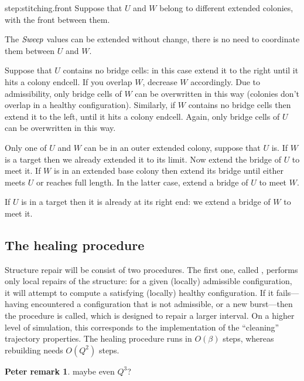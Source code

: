 \documentclass[11pt]{memoir}
\newcommand{\authnote}[3]
{\text{{ \textcolor{#3}{\( \langle\hspace{-0.2em}\langle \)\textsf{\footnotesize #1: #2}\( \rangle\hspace{-0.2em}\rangle \)}}}}
\newcommand{\authnote}[2]{}
\newcommand{\Pnote}[1]{{\authnote{P}{#1}{cyan}}}
\theoremstyle{definition} %
\newtheorem{Premark}{\color{cyan}Peter remark}
\newenvironment{premark}{\begin{Premark}\color{cyan}}{\varqed\end{Premark}}
\renewcommand{\Pnote}[1]{\begin{premark}#1\end{premark}}
\newcommand{\fld}[1]{\ensuremath{\textit{#1\/}}}
\newcommand{\Q}{Q}
\newcommand{\Sweep}{\fld{Sweep}}
\begin{document}
\begin{Proof}
\begin{step+}{step:stitching.front}
Suppose that \( U \) and \( W \) belong to different extended colonies, with the front between them.
\end{step+}
\begin{prooof}
The \( \Sweep \) values can be extended without change, there is no need to coordinate them
between \( U \) and \( W \).

Suppose that \( U \) contains no bridge cells: in this case extend it to the right until it hits
a colony endcell.
If you overlap \( W \), decrease \( W \) accordingly.
Due to admissibility, only bridge cells of \( W \) can be overwritten in this way
(colonies don't overlap in a healthy configuration).
Similarly, if \( W \) contains no bridge cells then extend it to the left, until it hits a colony endcell.
Again, only bridge cells of \( U \) can be overwritten in this way.

Only one of \( U \) and \( W \) can be in an outer extended colony, suppose that \( U \) is.
If \( W \) is a target then we already extended it to its limit.
Now extend the bridge of \( U \) to meet it.
If \( W \) is in an extended base colony then extend its bridge until either meets \( U \) or
reaches full length.
In the latter case, extend a bridge of \( U \) to meet \( W \).

If \( U \) is in a target then it is already at its right end: we extend a bridge of \( W \) to meet it.
\end{prooof} %
\end{Proof}


\subsection{The healing procedure}\label{sec:healing-proc}

Structure repair will be consist of two procedures.
The first one, called , performs
only local repairs of the structure: for a given (locally) admissible configuration,
it will attempt to compute a satisfying (locally) healthy configuration.
If it fails---having encountered a configuration that is not admissible, or
a new burst---then the  procedure is called, which is designed
to repair a larger interval.
On a higher level of simulation, 
this corresponds to the implementation of the ``cleaning'' trajectory properties.
The healing procedure runs in \( O(\beta) \) 
steps, whereas rebuilding needs \( O(\Q^{2}) \) steps. \Pnote{maybe even \( \Q^{3} \)?}
\end{document}

